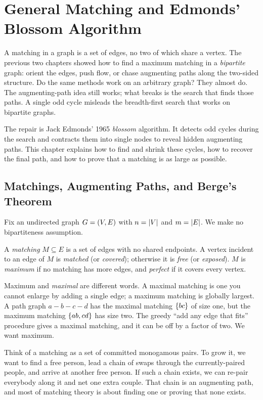 \chapter{General Matching and Edmonds' Blossom Algorithm}

A matching in a graph is a set of edges, no two of which share a vertex. The previous two chapters showed how to find a maximum matching in a \emph{bipartite} graph: orient the
edges, push flow, or chase augmenting paths along the two-sided structure. Do the
same methods work on an arbitrary graph? They almost do. The augmenting-path
idea still works; what breaks is the search that finds those paths. A single odd cycle
misleads the breadth-first search that works on bipartite graphs.

The repair is Jack Edmonds' 1965 \emph{blossom} algorithm. It detects odd cycles during the search and contracts them into single nodes to reveal hidden augmenting paths. This chapter explains how to find and shrink these cycles, how to recover the final path, and how to prove that a matching is as large as possible.

\chapterline

\section{Matchings, Augmenting Paths, and Berge's Theorem}

Fix an undirected graph $G=(V,E)$ with $n=\lvert V\rvert$ and $m=\lvert E\rvert$. We make no bipartiteness
assumption.

\begin{definition}[Matching]
\label{ch17:def-matching}
A \emph{matching} $M\subseteq E$ is a set of edges with no shared endpoints. A vertex incident to an
edge of $M$ is \emph{matched} (or \emph{covered}); otherwise it is \emph{free} (or
\emph{exposed}). $M$ is \emph{maximum} if no matching has more edges, and \emph{perfect} if it covers
every vertex.
\end{definition}

Maximum and \emph{maximal} are different words. A maximal matching is one you cannot enlarge by adding
a single edge; a maximum matching is globally largest. A path graph $a\!-\!b\!-\!c\!-\!d$ has the
maximal matching $\{bc\}$ of size one, but the maximum matching $\{ab,cd\}$ has size two. The
greedy ``add any edge that fits'' procedure gives a maximal matching, and it can be off by a factor of
two. We want maximum.

\begin{intuitionbox}
Think of a matching as a set of committed monogamous pairs. To grow it, we want to find a free
person, lead a chain of swaps through the currently-paired people, and arrive at another free person.
If such a chain exists, we can re-pair everybody along it and net one extra couple. That chain is an
augmenting path, and most of matching theory is about finding one or proving that none
exists.
\end{intuitionbox}

